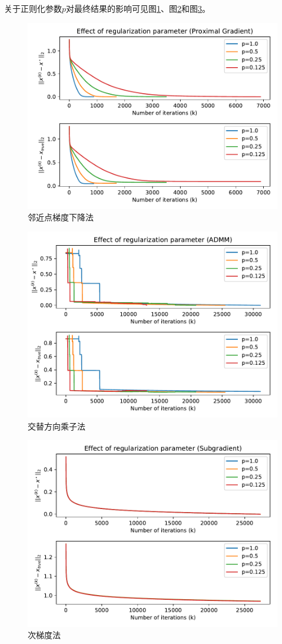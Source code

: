 \documentclass[logo,reportComp]{thesis}
\begin{document}
关于正则化参数$p$对最终结果的影响可见图\ref{fig:pprox}、图\ref{fig:padmm}和图\ref{fig:psubgrad}。
\begin{figure}[H]
\centering
\includegraphics[width=0.8\linewidth]{fig/pprox.pdf}
\caption{邻近点梯度下降法}
\label{fig:pprox}
\end{figure}
\begin{figure}[H]
\centering
\includegraphics[width=0.8\linewidth]{fig/padmm.pdf}
\caption{交替方向乘子法}
\label{fig:padmm}
\end{figure}
\begin{figure}[H]
\centering
\includegraphics[width=0.8\linewidth]{fig/psubgrad.pdf}
\caption{次梯度法}
\label{fig:psubgrad}
\end{figure}
\end{document}
